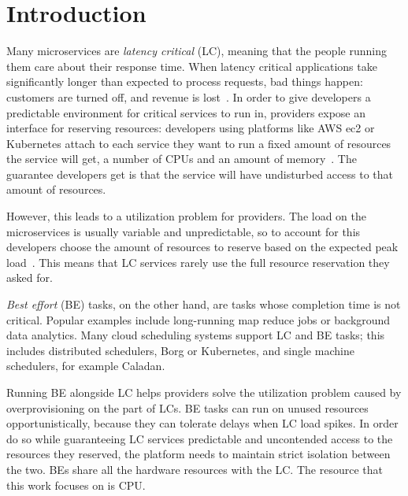 \section{Introduction}
\label{s:intro}

Many microservices are \textit{latency critical} (LC), meaning that the people
running them care about their response time. When latency critical applications
take significantly longer than expected to process requests, bad things happen:
customers are turned off, and revenue is lost~\cite{google-speed-matters,
amz-speed-matters}. In order to give developers a predictable environment for
critical services to run in, providers expose an interface for reserving
resources: developers using platforms like AWS ec2 or Kubernetes attach to each
service they want to run a fixed amount of resources the service will get, \ie{}
a number of CPUs and an amount of memory~\cite{aws-ec2-resources,
kubernetes-resources}. The guarantee developers get is that the service will
have undisturbed access to that amount of resources.

However, this leads to a utilization problem for providers. The load on the
microservices is usually variable and unpredictable, so to account for this
developers choose the amount of resources to reserve based on the expected peak
load~\cite{borg, nu, overprovision}. This means that LC services rarely use the
full resource reservation they asked for.

\textit{Best effort} (BE) tasks, on the other hand, are tasks whose completion
time is not critical. Popular examples include long-running map reduce jobs or
background data analytics. Many cloud scheduling systems support LC and BE
tasks; this includes distributed schedulers, \eg{} Borg\cite{borg} or
Kubernetes\cite{kubernetes-resources}, and single machine schedulers, for
example Caladan\cite{caladan}.

Running BE alongside LC helps providers solve the utilization problem caused by
overprovisioning on the part of LCs. BE tasks can run on unused resources
opportunistically, because they can tolerate delays when LC load spikes. In
order do so while guaranteeing LC services predictable and uncontended access to
the resources they reserved, the platform needs to maintain strict isolation
between the two. BEs share all the hardware resources with the LC. The resource
that this work focuses on is CPU.


